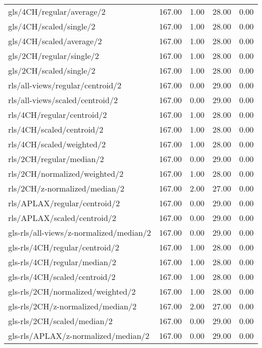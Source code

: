 \begin{longtable}{lrrrr}
    gls/4CH/regular/average/2                 & 167.00 &  1.00 & 28.00 &  0.00 \\
    gls/4CH/scaled/single/2                   & 167.00 &  1.00 & 28.00 &  0.00 \\
    gls/4CH/scaled/average/2                  & 167.00 &  1.00 & 28.00 &  0.00 \\
    gls/2CH/regular/single/2                  & 167.00 &  1.00 & 28.00 &  0.00 \\
    gls/2CH/scaled/single/2                   & 167.00 &  1.00 & 28.00 &  0.00 \\
    rls/all-views/regular/centroid/2          & 167.00 &  0.00 & 29.00 &  0.00 \\
    rls/all-views/scaled/centroid/2           & 167.00 &  0.00 & 29.00 &  0.00 \\
    rls/4CH/regular/centroid/2                & 167.00 &  1.00 & 28.00 &  0.00 \\
    rls/4CH/scaled/centroid/2                 & 167.00 &  1.00 & 28.00 &  0.00 \\
    rls/4CH/scaled/weighted/2                 & 167.00 &  1.00 & 28.00 &  0.00 \\
    rls/2CH/regular/median/2                  & 167.00 &  0.00 & 29.00 &  0.00 \\
    rls/2CH/normalized/weighted/2             & 167.00 &  1.00 & 28.00 &  0.00 \\
    rls/2CH/z-normalized/median/2             & 167.00 &  2.00 & 27.00 &  0.00 \\
    rls/APLAX/regular/centroid/2              & 167.00 &  0.00 & 29.00 &  0.00 \\
    rls/APLAX/scaled/centroid/2               & 167.00 &  0.00 & 29.00 &  0.00 \\
    gls-rls/all-views/z-normalized/median/2   & 167.00 &  0.00 & 29.00 &  0.00 \\
    gls-rls/4CH/regular/centroid/2            & 167.00 &  1.00 & 28.00 &  0.00 \\
    gls-rls/4CH/regular/median/2              & 167.00 &  1.00 & 28.00 &  0.00 \\
    gls-rls/4CH/scaled/centroid/2             & 167.00 &  1.00 & 28.00 &  0.00 \\
    gls-rls/2CH/normalized/weighted/2         & 167.00 &  1.00 & 28.00 &  0.00 \\
    gls-rls/2CH/z-normalized/median/2         & 167.00 &  2.00 & 27.00 &  0.00 \\
    gls-rls/2CH/scaled/median/2               & 167.00 &  0.00 & 29.00 &  0.00 \\
    gls-rls/APLAX/z-normalized/median/2       & 167.00 &  0.00 & 29.00 &  0.00 \\
    \hline
\end{longtable}

